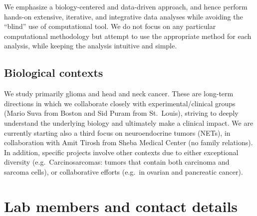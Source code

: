 \documentclass[]{book}
\begin{document}
We emphasize a biology-centered and data-driven approach, and hence
perform hands-on extensive, iterative, and integrative data analyses
while avoiding the ``blind'' use of computational tool. We do not focus
on any particular computational methodology but attempt to use the
appropriate method for each analysis, while keeping the analysis
intuitive and simple.

\section{Biological contexts}\label{biological-contexts}

We study primarily glioma and head and neck cancer. These are long-term
directions in which we collaborate closely with experimental/clinical
groups (Mario Suva from Boston and Sid Puram from St.~Louis), striving
to deeply understand the underlying biology and ultimately make a
clinical impact. We are currently starting also a third focus on
neuroendocrine tumors (NETs), in collaboration with Amit Tirosh from
Sheba Medical Center (no family relations). In addition, specific
projects involve other contexts due to either exceptional diversity
(e.g.~Carcinosarcomas: tumors that contain both carcinoma and sarcoma
cells), or collaborative efforts (e.g.~in ovarian and pancreatic
cancer).

\chapter{Lab members and contact details}\label{contact}
\end{document}
